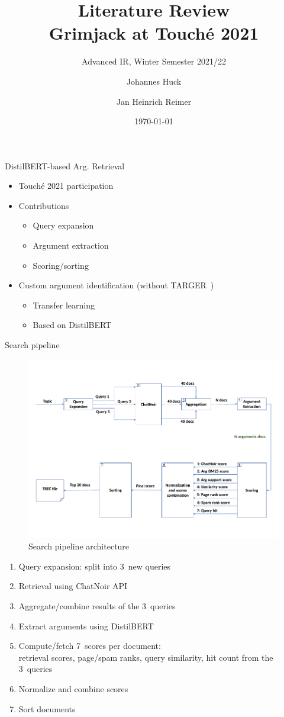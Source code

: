 \documentclass[english]{mlutalk}
\title{Literature Review\\Grimjack at Touché 2021}
\subtitle{Advanced IR, Winter Semester 2021/22}
\author{Johannes Huck \and Jan Heinrich Reimer}
\institute{Martin Luther University Halle-Wittenberg}
\date{\today}
\begin{document}
\titleframe

\begin{frame}{DistilBERT-based Arg. Retrieval~\cite{AlhamzehBEM2021}}
  \begin{itemize}
    \item Touché 2021 participation
    \item Contributions
    \begin{itemize}
      \item Query expansion
      \item Argument extraction
      \item Scoring/sorting
    \end{itemize}
    \item Custom argument identification (without TARGER~\cite{ChernodubOHBHBP2019})
    \begin{itemize}
      \item Transfer learning
      \item Based on DistilBERT~\cite{SanhDCW2019}
    \end{itemize}
  \end{itemize}
\end{frame}

\begin{frame}[allowframebreaks]{Search pipeline}
  \begin{figure}
    \centering
    \includegraphics[width=0.75\linewidth]{figures/distilbert-based-arg-retrieval-architecture.pdf}
    \caption{Search pipeline architecture~\cite{AlhamzehBEM2021}}
    \label{architecture}
  \end{figure}

  \begin{enumerate}
    \item Query expansion: split into 3~new queries
    \item Retrieval using ChatNoir API~\cite{BevendorffSHP2018,PotthastHSGMTW2012}
    \item Aggregate/combine results of the 3~queries
    \item Extract arguments using DistilBERT~\cite{SanhDCW2019}
    \item Compute/fetch 7~scores per document: \\ retrieval scores, page/spam ranks, query similarity, hit count from the 3~queries
    \item Normalize and combine scores
    \item Sort documents
  \end{enumerate}
\end{frame}
\end{document}
